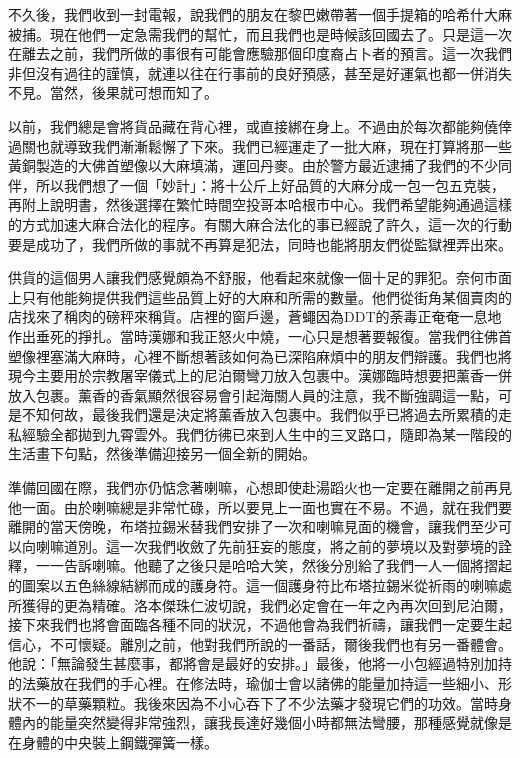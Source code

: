 不久後，我們收到一封電報，說我們的朋友在黎巴嫩帶著一個手提箱的哈希什大麻被捕。現在他們一定急需我們的幫忙，而且我們也是時候該回國去了。只是這一次在離去之前，我們所做的事很有可能會應驗那個印度裔占卜者的預言。這一次我們非但沒有過往的謹慎，就連以往在行事前的良好預感，甚至是好運氣也都一併消失不見。當然，後果就可想而知了。

以前，我們總是會將貨品藏在背心裡，或直接綁在身上。不過由於每次都能夠僥倖過關也就導致我們漸漸鬆懈了下來。我們已經運走了一批大麻，現在打算將那一些黃銅製造的大佛首塑像以大麻填滿，運回丹麥。由於警方最近逮捕了我們的不少同伴，所以我們想了一個「妙計」：將十公斤上好品質的大麻分成一包一包五克裝，再附上說明書，然後選擇在繁忙時間空投哥本哈根市中心。我們希望能夠通過這樣的方式加速大麻合法化的程序。有關大麻合法化的事已經說了許久，這一次的行動要是成功了，我們所做的事就不再算是犯法，同時也能將朋友們從監獄裡弄出來。

供貨的這個男人讓我們感覺頗為不舒服，他看起來就像一個十足的罪犯。奈何市面上只有他能夠提供我們這些品質上好的大麻和所需的數量。他們從街角某個賣肉的店找來了稱肉的磅秤來稱貨。店裡的窗戶邊，蒼蠅因為DDT的荼毒正奄奄一息地作出垂死的掙扎。當時漢娜和我正怒火中燒，一心只是想著要報復。當我們往佛首塑像裡塞滿大麻時，心裡不斷想著該如何為已深陷麻煩中的朋友們辯護。我們也將現今主要用於宗教屠宰儀式上的尼泊爾彎刀放入包裹中。漢娜臨時想要把薰香一併放入包裹。薰香的香氣顯然很容易會引起海關人員的注意，我不斷強調這一點，可是不知何故，最後我們還是決定將薰香放入包裹中。我們似乎已將過去所累積的走私經驗全都拋到九霄雲外。我們彷彿已來到人生中的三叉路口，隨即為某一階段的生活畫下句點，然後準備迎接另一個全新的開始。

準備回國在際，我們亦仍惦念著喇嘛，心想即使赴湯蹈火也一定要在離開之前再見他一面。由於喇嘛總是非常忙碌，所以要見上一面也實在不易。不過，就在我們要離開的當天傍晚，布塔拉錫米替我們安排了一次和喇嘛見面的機會，讓我們至少可以向喇嘛道別。這一次我們收斂了先前狂妄的態度，將之前的夢境以及對夢境的詮釋，一一告訴喇嘛。他聽了之後只是哈哈大笑，然後分別給了我們一人一個將摺起的圖案以五色絲線結綁而成的護身符。這一個護身符比布塔拉錫米從祈雨的喇嘛處所獲得的更為精確。洛本傑珠仁波切說，我們必定會在一年之內再次回到尼泊爾，接下來我們也將會面臨各種不同的狀況，不過他會為我們祈禱，讓我們一定要生起信心，不可懷疑。離別之前，他對我們所說的一番話，爾後我們也有另一番體會。他說：「無論發生甚麼事，都將會是最好的安排。」最後，他將一小包經過特別加持的法藥放在我們的手心裡。在修法時，瑜伽士會以諸佛的能量加持這一些細小、形狀不一的草藥顆粒。我後來因為不小心吞下了不少法藥才發現它們的功效。當時身體內的能量突然變得非常強烈，讓我長達好幾個小時都無法彎腰，那種感覺就像是在身體的中央裝上鋼鐵彈簧一樣。

